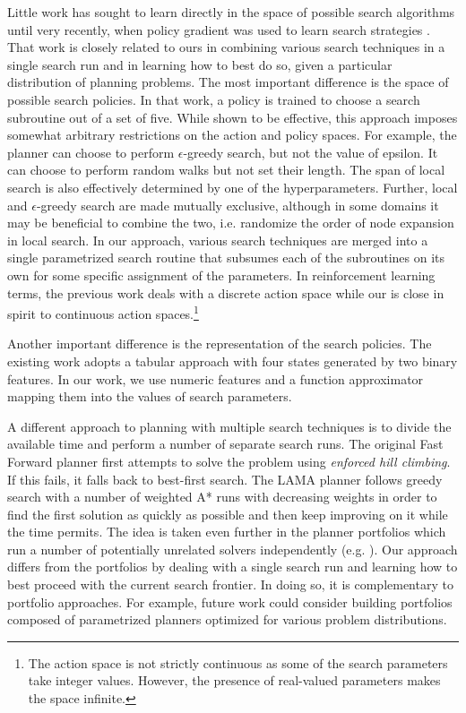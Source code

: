 \documentclass[letterpaper]{article} %
\begin{document}
Little work has sought to learn directly in the space of possible search algorithms until very recently, when policy gradient was used to learn search strategies \cite{Gomoluch2019}. That work is closely related to ours in combining various search techniques in a single search run and in learning how to best do so, given a particular distribution of planning problems. The most important difference is the space of possible search policies. In that work, a policy is trained to choose a search subroutine out of a set of five. While shown to be effective, this approach imposes somewhat arbitrary restrictions on the action and policy spaces. For example, the planner can choose to perform $\epsilon$-greedy search, but not the value of epsilon. It can choose to perform random walks but not set their length. The span of local search is also effectively determined by one of the hyperparameters. Further, local and $\epsilon$-greedy search are made mutually exclusive, although in some domains it may be beneficial to combine the two, i.e. randomize the order of node expansion in local search. In our approach, various search techniques are merged into a single parametrized search routine that subsumes each of the subroutines on its own for some specific assignment of the parameters. In reinforcement learning terms, the previous work deals with a discrete action space while our is close in spirit to continuous action spaces.\footnote{The action space is not strictly continuous as some of the search parameters take integer values. However, the presence of real-valued parameters makes the space infinite.}

Another important difference is the representation of the search policies. The existing work \cite{Gomoluch2019} adopts a tabular approach with four states generated by two binary features. In our work, we use numeric features and a function approximator mapping them into the values of search parameters.

A different approach to planning with multiple search techniques is to divide the available time and perform a number of separate search runs. The original Fast Forward planner \cite{Hoffmann2001} first attempts to solve the problem using \emph{enforced hill climbing}. If this fails, it falls back to best-first search. The LAMA planner \cite{Richter2010} follows greedy search with a number of weighted A* runs with decreasing weights in order to find the first solution as quickly as possible and then keep improving on it while the time permits. The idea is taken even further in the planner portfolios which run a number of potentially unrelated solvers independently (e.g. \cite{Fawcett2011,Helmert2011,Cenamor2016}). Our approach differs from the portfolios by dealing with a single search run and learning how to best proceed with the current search frontier. In doing so, it is complementary to portfolio approaches. For example, future work could consider building portfolios composed of parametrized planners optimized for various problem distributions.
\end{document}
